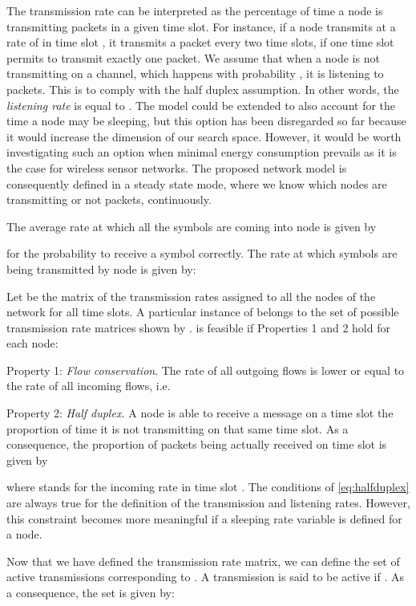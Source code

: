 \documentclass[a4paper]{article}
\begin{document}
The transmission rate can be interpreted as the percentage of time a node is transmitting packets in a given time slot. For instance, if a node  transmits at a rate of  in time slot , it transmits a packet every two time slots, if one time slot permits to transmit exactly one packet. 
We assume that when a node is not transmitting on a channel, which happens with probability , it is listening to packets. This is to comply with the half duplex assumption. In other words, the \emph{listening rate} is equal to . The model could be extended to also account for the time a node may be sleeping, but this option has been disregarded so far because it would increase the dimension of our search space. However, it would be worth investigating such an option when minimal energy consumption prevails as it is the case for wireless sensor networks.
The proposed network model is consequently defined in a steady state mode, where we know which nodes are transmitting or not packets, continuously.

The average rate at which all the symbols are coming into node  is given by 

for  the probability to receive a symbol correctly. 
The rate at which symbols are being transmitted by node  is given by: 


Let  be the matrix of the transmission rates assigned to all the nodes of the network for all time slots. A particular instance of  belongs to the set of possible transmission rate matrices shown by .
 is feasible if Properties 1 and 2 hold for each node: 

{\sc Property 1:} {\it Flow conservation}.  The rate of all outgoing flows is lower or equal to the rate of all incoming flows, i.e.
  

{\sc Property 2:} {\it Half duplex.} A node  is able to receive a message on a time slot  the proportion of time it is not transmitting on that same time slot. 
As a consequence, the proportion of packets being actually received on time slot  is given by
  
\noindent where  stands for the incoming rate in time slot . The conditions of \eqref{eq:halfduplex} are always true for the definition of the transmission and listening rates. However, this constraint becomes more meaningful if a sleeping rate variable is defined for a node. 
  
Now that we have defined the transmission rate matrix, we can define the set of active transmissions  corresponding to . A transmission  is said to be active if . As a consequence, the set  is given by:
\end{document}
